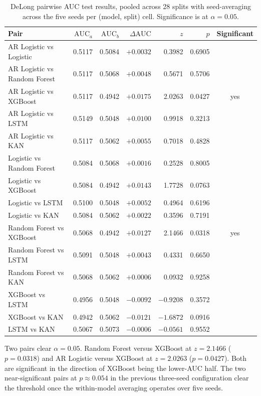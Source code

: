 \documentclass[12pt,a4paper,oneside]{article}
\begin{document}
\begin{table}[H]
\centering
\footnotesize
\begin{tabular}{lrrrrrc}
\toprule
Pair & $\text{AUC}_a$ & $\text{AUC}_b$ & $\Delta \text{AUC}$ & $z$ & $p$ & Significant \\
\midrule
AR Logistic vs Logistic         & 0.5117 & 0.5084 & $+0.0032$ &  0.3982 & 0.6905 & \\
AR Logistic vs Random Forest    & 0.5117 & 0.5068 & $+0.0048$ &  0.5671 & 0.5706 & \\
AR Logistic vs XGBoost          & 0.5117 & 0.4942 & $+0.0175$ &  2.0263 & 0.0427 & yes \\
AR Logistic vs LSTM             & 0.5149 & 0.5048 & $+0.0100$ &  0.9918 & 0.3213 & \\
AR Logistic vs KAN              & 0.5117 & 0.5062 & $+0.0055$ &  0.7018 & 0.4828 & \\
Logistic vs Random Forest       & 0.5084 & 0.5068 & $+0.0016$ &  0.2528 & 0.8005 & \\
Logistic vs XGBoost             & 0.5084 & 0.4942 & $+0.0143$ &  1.7728 & 0.0763 & \\
Logistic vs LSTM                & 0.5100 & 0.5048 & $+0.0052$ &  0.4964 & 0.6196 & \\
Logistic vs KAN                 & 0.5084 & 0.5062 & $+0.0022$ &  0.3596 & 0.7191 & \\
Random Forest vs XGBoost        & 0.5068 & 0.4942 & $+0.0127$ &  2.1466 & 0.0318 & yes \\
Random Forest vs LSTM           & 0.5091 & 0.5048 & $+0.0043$ &  0.4331 & 0.6650 & \\
Random Forest vs KAN            & 0.5068 & 0.5062 & $+0.0006$ &  0.0932 & 0.9258 & \\
XGBoost vs LSTM                 & 0.4956 & 0.5048 & $-0.0092$ & $-0.9208$ & 0.3572 & \\
XGBoost vs KAN                  & 0.4942 & 0.5062 & $-0.0121$ & $-1.6872$ & 0.0916 & \\
LSTM vs KAN                     & 0.5067 & 0.5073 & $-0.0006$ & $-0.0561$ & 0.9552 & \\
\bottomrule
\end{tabular}
\caption{DeLong pairwise AUC test results, pooled across 28 splits with seed-averaging across the five seeds per (model, split) cell. Significance is at $\alpha = 0.05$.}
\label{tab:delong_pairs}
\end{table}

Two pairs clear $\alpha = 0.05$. Random Forest versus XGBoost at $z = 2.1466$ ($p = 0.0318$) and AR Logistic versus XGBoost at $z = 2.0263$ ($p = 0.0427$). Both are significant in the direction of XGBoost being the lower-AUC half. The two near-significant pairs at $p \approx 0.054$ in the previous three-seed configuration clear the threshold once the within-model averaging operates over five seeds.
\end{document}
